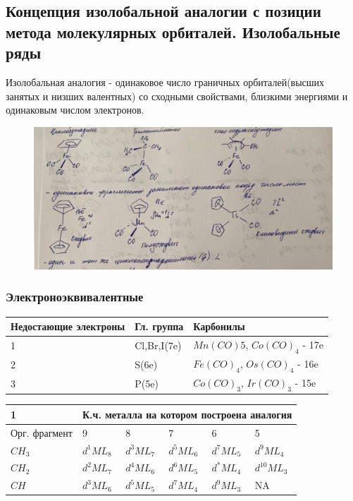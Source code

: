\subsection{Концепция изолобальной аналогии с позиции метода молекулярных орбиталей. Изолобальные ряды}

Изолобальная аналогия - одинаковое число граничных орбиталей(высших занятых и низших валентных) со сходными свойствами, близкими энергиями и одинаковым числом электронов.

\begin{figure}[H]
\centering
\includegraphics[scale=.300]{images/isolab_examples.png}
\end{figure}

\subsubsection*{Электроноэквивалентные}
\begin{tabular}{|l|l|l|}
\hline
	Недостающие электроны & Гл. группа & Карбонилы\\
\hline
	1 & Cl,Br,I(7e) & $Mn(CO)5$, $Co(CO)_4$ - 17e\\
\hline
	2 & S(6e) & $Fe(CO)_4$, $Os(CO)_4$ - 16e\\
\hline
	3 & P(5e) & $Co(CO)_3$, $Ir(CO)_3$ - 15e\\
\hline
\end{tabular}



\begin{tabular}{|l|l|l|l|l|l|}
\hline
1 & \multicolumn{5}{l|}{К.ч. металла на котором построена аналогия} \\ \hline
Орг. фрагмент & 9    & 8   & 7   & 6 & 5   \\ \hline
$CH_3$ & $d^1ML_8$   & $d^3ML_7$   & $d^5ML_6$   & $d^7ML_5$ & $d^9ML_4$  \\ \hline
$CH_2$ & $d^2ML_7$    & $d^4ML_6$   & $d^6ML_5$   & $d^*ML_4$ & $d^10ML_3$   \\ \hline
$CH$ & $d^3ML_6$    & $d^5ML_5$   & $d^7ML_4$   & $d^9ML_3$ & NA   \\ \hline
\end{tabular}


